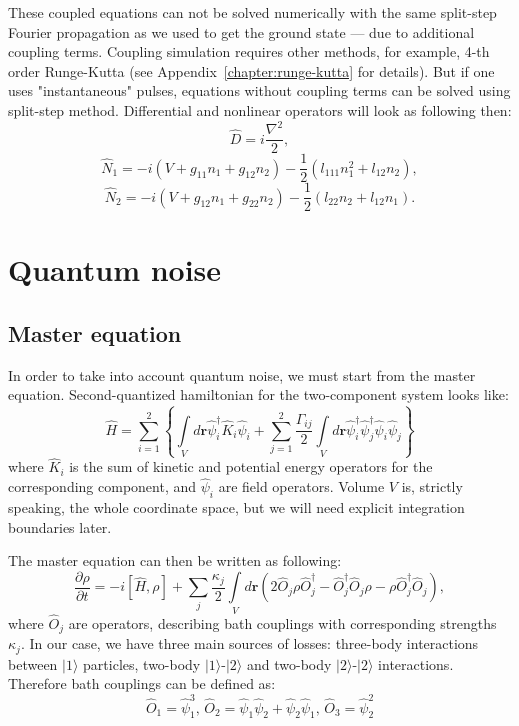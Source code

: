\documentclass[12pt,notitlepage]{report}
\begin{document}
These coupled equations can not be solved numerically with the same split-step Fourier propagation as we used to get the ground state ---
due to additional coupling terms.
Coupling simulation requires other methods, for example, 4-th order Runge-Kutta
(see Appendix~\ref{chapter:runge-kutta} for details).
But if one uses "instantaneous" pulses, equations without coupling terms can be solved using split-step method.
Differential and nonlinear operators will look as following then:
\[ \hat{D} = i \frac{\nabla^2}{2}, \]
\[ \hat{N}_1 = -i \left( V + g_{11} n_1 + g_{12} n_2 \right) - \frac{1}{2} \left( l_{111} n_1^2 + l_{12} n_2 \right), \]
\[
\hat{N}_2 = -i \left( V + g_{12} n_1 + g_{22} n_2 \right) -
\frac{1}{2} \left( l_{22} n_2 + l_{12} n_1 \right).
\]

\section*{Quantum noise}

\subsection*{Master equation}

In order to take into account quantum noise, we must start from the master equation.
Second-quantized hamiltonian for the two-component system looks like:
\[
\hat{H} = \sum\limits^2_{i=1} \left\{ \int\limits_V d\mathbf{r} \hat{\psi}_i^\dagger \hat{K}_i \hat{\psi}_i +
\sum\limits^2_{j=1} \frac{\Gamma_{ij}}{2} \int\limits_V d\mathbf{r} \hat{\psi}_i^\dagger \hat{\psi}_j^\dagger \hat{\psi}_i \hat{\psi}_j \right\}
\]
where $\hat{K}_i$ is the sum of kinetic and potential energy operators for the corresponding component,
and $\hat{\psi}_i$ are field operators.
Volume $V$ is, strictly speaking, the whole coordinate space, but we will need explicit integration boundaries later.

The master equation can then be written as following:
\[
\frac{\partial\rho}{\partial t} = -i [\hat{H}, \rho] + \sum\limits_j \frac{\kappa_j}{2} \int\limits_V d\mathbf{r}
\left( 2  \hat{O}_j \rho \hat{O}_j^\dagger - \hat{O}_j^\dagger \hat{O}_j \rho - \rho \hat{O}_j^\dagger \hat{O}_j \right),
\]
where $\hat{O}_j$ are operators, describing bath couplings with corresponding strengths $\kappa_j$.
In our case, we have three main sources of losses: three-body interactions between $\vert1\rangle$ particles,
two-body $\vert1\rangle$-$\vert2\rangle$ and two-body $\vert2\rangle$-$\vert2\rangle$ interactions.
Therefore bath couplings can be defined as:
\begin{equation}
\label{bath_coupling_operators}
\hat{O}_1 = \hat{\psi}_1^3,\, \hat{O}_2 = \hat{\psi}_1 \hat{\psi}_2 + \hat{\psi}_2 \hat{\psi}_1,\, \hat{O}_3 = \hat{\psi}_2^2
\end{equation}
\end{document}
